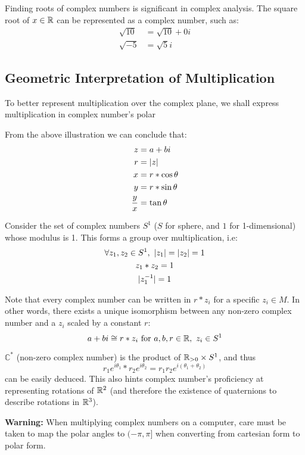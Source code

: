 \documentclass[12pt]{article}
\begin{document}
	Finding roots of complex numbers is significant in complex analysis. The square root of $x \in \mathbb{R}$ can be represented as a complex number, such as:
	\begin{align*}
		\sqrt{10} &= \sqrt{10} + 0i \\
		\sqrt{-5} &= \sqrt{5}i
	\end{align*}
	
	\subsection{Geometric Interpretation of Multiplication}
	
	To better represent multiplication over the complex plane, we shall express multiplication in complex number's polar 
	\begin{center}
	\end{center}
	
	From the above illustration we can conclude that:
	\begin{align*}
		z &= a + bi \\
		r &= \lvert z \rvert \\
		x &= r * \cos \theta \\
		y &= r * \sin \theta \\
		\frac{y}{x} &= \tan \theta
	\end{align*}
	
	Consider the set of complex numbers $S^1$ ($S$ for sphere, and $1$ for 1-dimensional) whose modulus is 1. This forms a group over multiplication, i.e:
	\begin{gather*}
		\forall z_1, z_2 \in S^1,\ \lvert z_1 \rvert = \lvert z_2 \rvert = 1 \\
		z_1 * z_2 = 1 \\
		\lvert z_1^{-1} \rvert = 1
	\end{gather*}
	
	Note that every complex number can be written in $r * z_i$ for a specific $z_i \in M$. In other words, there exists a unique isomorphism between any non-zero complex number and a $z_i$ scaled by a constant $r$: $$a + bi \cong r * z_i \ \text{for}\ a, b, r \in \mathbb{R},\ z_i \in S^1$$
	
	
	$\mathbb{C}^*$ (non-zero complex number) is the product of $\mathbb{R}_{>0} \times S^1$, and thus $$r_1 e^{i\theta_1} * r_2 e^{i\theta_2} = r_1r_2e^{i(\theta_1 + \theta_2)}$$
	can be easily deduced. This also hints complex number's proficiency at representing rotations of $\mathbb{R}^2$ (and therefore the existence of quaternions to describe rotations in $\mathbb{R}^3$).
	
	\textbf{Warning:} When multiplying complex numbers on a computer, care must be taken to map the polar angles to $(-\pi, \pi]$ when converting from cartesian form to polar form.
	
\end{document}
